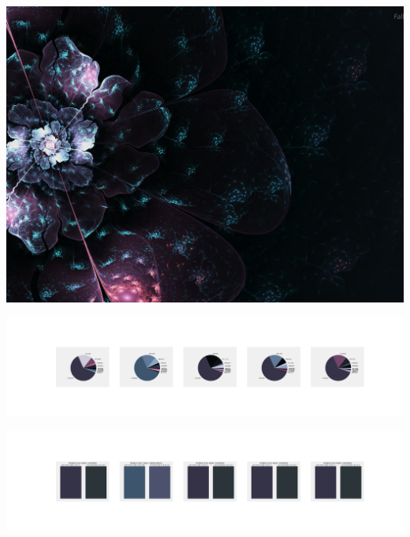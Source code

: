 \documentclass[11pt]{article}
\begin{document}
\begin{landscape}
    \begin{center}
    \includegraphics[width=\textwidth]{./nbimg/file (93).jpg}
    \end{center}

    \begin{center}
    \includegraphics[width=250mm]{./nbimg/pie-444.jpg}
    \end{center}

    \begin{center}
    \includegraphics[width=250mm]{./nbimg/peak-444.jpg}
    \end{center}
    


\end{landscape}
\end{document}
